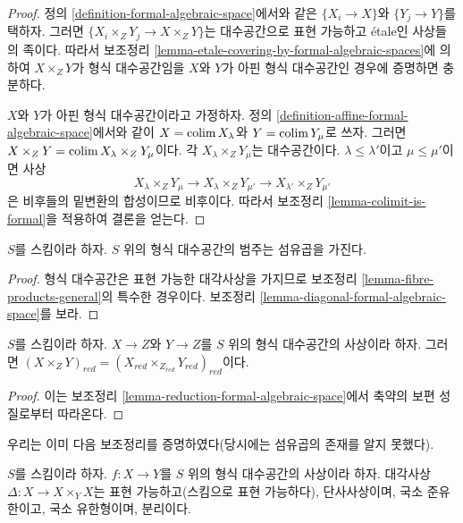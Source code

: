 \begin{proof}
정의 \ref{definition-formal-algebraic-space}에서와 같은
$\{X_i \to X\}$와 $\{Y_j \to Y\}$를 택하자.
그러면 $\{X_i \times_Z Y_j \to X \times_Z Y\}$는
대수공간으로 표현 가능하고 \'etale인 사상들의 족이다.
따라서 보조정리 \ref{lemma-etale-covering-by-formal-algebraic-spaces}에
의하여 $X \times_Z Y$가 형식 대수공간임을 $X$와 $Y$가
아핀 형식 대수공간인 경우에 증명하면 충분하다.

\medskip\noindent
$X$와 $Y$가 아핀 형식 대수공간이라고 가정하자. 정의
\ref{definition-affine-formal-algebraic-space}에서와 같이
$X = \mathop{\mathrm{colim}}\nolimits X_\lambda$와 $Y = \mathop{\mathrm{colim}}\nolimits Y_\mu$로 쓰자.
그러면 $X \times_Z Y = \mathop{\mathrm{colim}}\nolimits X_\lambda \times_Z Y_\mu$이다.
각 $X_\lambda \times_Z Y_\mu$는 대수공간이다.
$\lambda \leq \lambda'$이고 $\mu \leq \mu'$이면 사상
$$
X_\lambda \times_Z Y_\mu \to
X_\lambda \times_Z Y_{\mu'} \to
X_{\lambda'} \times_Z Y_{\mu'}
$$
은 비후들의 밑변환의 합성이므로 비후이다.
따라서 보조정리 \ref{lemma-colimit-is-formal}을 적용하여 결론을 얻는다.
\end{proof}

\begin{lemma}
\label{lemma-fibre-products}
$S$를 스킴이라 하자. $S$ 위의 형식 대수공간의 범주는 섬유곱을 가진다.
\end{lemma}

\begin{proof}
형식 대수공간은 표현 가능한 대각사상을 가지므로 보조정리
\ref{lemma-fibre-products-general}의 특수한 경우이다. 보조정리
\ref{lemma-diagonal-formal-algebraic-space}를 보라.
\end{proof}

\begin{lemma}
\label{lemma-reduction-fibre-products}
$S$를 스킴이라 하자. $X \to Z$와 $Y \to Z$를 $S$ 위의
형식 대수공간의 사상이라 하자. 그러면
$(X \times_Z Y)_{red} = (X_{red} \times_{Z_{red}} Y_{red})_{red}$이다.
\end{lemma}

\begin{proof}
이는 보조정리 \ref{lemma-reduction-formal-algebraic-space}에서
축약의 보편 성질로부터 따라온다.
\end{proof}

\noindent
우리는 이미 다음 보조정리를 증명하였다(당시에는 섬유곱의 존재를
알지 못했다).

\begin{lemma}
\label{lemma-diagonal-morphism-formal-algebraic-spaces}
$S$를 스킴이라 하자. $f : X \to Y$를 $S$ 위의 형식 대수공간의
사상이라 하자. 대각사상 $\Delta : X \to X \times_Y X$는
표현 가능하고(스킴으로 표현 가능하다), 단사사상이며, 국소 준유한이고,
국소 유한형이며, 분리이다.
\end{lemma}

